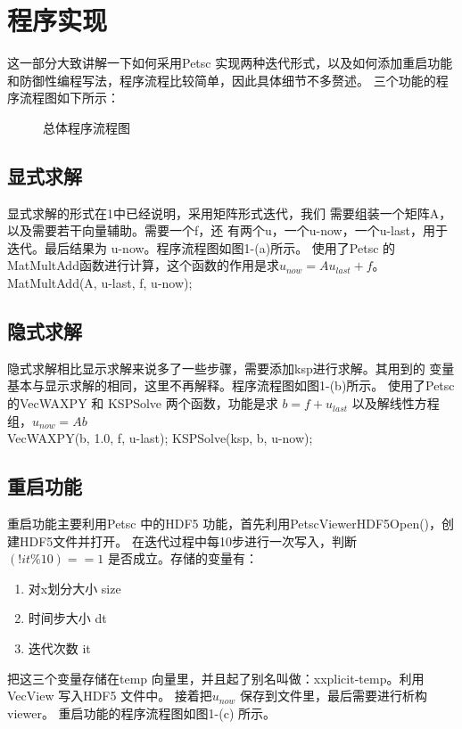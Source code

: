 \documentclass[10pt, a4paper]{article}
\begin{document}
\section{程序实现}
这一部分大致讲解一下如何采用Petsc 实现两种迭代形式，以及如何添加重启功能和防御性编程写法，程序流程比较简单，因此具体细节不多赘述。
三个功能的程序流程图如下所示：

\begin{figure}[H]
\centering
{}%
%
%
\centering
\caption{ 总体程序流程图}
\end{figure}
\subsection{显式求解}
显式求解的形式在1中已经说明，采用矩阵形式迭代，我们
需要组装一个矩阵A，以及需要若干向量辅助。需要一个f，还
有两个u，一个u-now，一个u-last，用于迭代。最后结果为
u-now。程序流程图如图1-(a)所示。
使用了Petsc 的MatMultAdd函数进行计算，这个函数的作用是求$u_{now}=Au_{last}+f$。
~\\

MatMultAdd(A, u-last, f, u-now);


\subsection{隐式求解}
隐式求解相比显示求解来说多了一些步骤，需要添加ksp进行求解。其用到的
变量基本与显示求解的相同，这里不再解释。程序流程图如图1-(b)所示。
使用了Petsc的VecWAXPY 和 KSPSolve 两个函数，功能是求 $b=f+u_{last}$ 
以及解线性方程组，$u_{now}=Ab$
~\\

VecWAXPY(b, 1.0, f, u-last);
KSPSolve(ksp, b, u-now);



\subsection{重启功能}
重启功能主要利用Petsc 中的HDF5 功能，首先利用PetscViewerHDF5Open()，创建HDF5文件并打开。
在迭代过程中每10步进行一次写入，判断 $ (!it\%10)==1 $
是否成立。存储的变量有：
\begin{enumerate}
    \item 对x划分大小 size
    \item 时间步大小 dt
    \item 迭代次数 it
\end{enumerate}
把这三个变量存储在temp 向量里，并且起了别名叫做：xxplicit-temp。利用VecView 写入HDF5 文件中。
接着把$u_{now}$ 保存到文件里，最后需要进行析构viewer。
重启功能的程序流程图如图1-(c) 所示。
\end{document}
